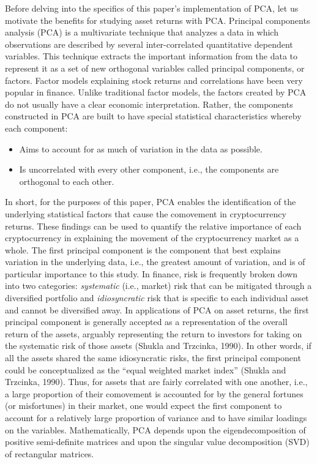 \documentclass[12pt,twoside]{article}
\begin{document}
Before delving into the specifics of this paper’s implementation of PCA, let us motivate the benefits for studying asset returns with PCA. Principal components analysis (PCA) is a multivariate technique that analyzes a data in which observations are described by several inter-correlated quantitative dependent variables. This technique extracts the important information from the data to represent it as a set of new orthogonal variables called principal components, or factors.
\bigbreak
Factor models explaining stock returns and correlations have been very popular in finance. Unlike traditional factor models, the factors created by PCA do not usually have a clear economic interpretation. Rather, the components constructed in PCA are built to have special statistical characteristics whereby each component: 
\begin{itemize}
	\item Aims to account for as much of variation in the data as possible.
	\item Is uncorrelated with every other component, i.e., the components are orthogonal to each other.
\end{itemize}

In short, for the purposes of this paper, PCA enables the identification of the underlying statistical factors that cause the comovement in cryptocurrency returns. These findings can be used to quantify the relative importance of each cryptocurrency in explaining the movement of the cryptocurrency market as a whole.
\bigbreak
The first principal component is the component that best explains variation in the underlying data, i.e., the greatest amount of variation, and is of particular importance to this study. In finance, risk is frequently broken down into two categories: \textit{systematic} (i.e., market) risk that can be mitigated through a diversified portfolio and \textit{idiosyncratic} risk that is specific to each individual asset and cannot be diversified away. In applications of PCA on asset returns, the first principal component is generally accepted as a representation of the overall return of the assets, arguably representing the return to investors for taking on the systematic risk of those assets (Shukla and Trzcinka, 1990). In other words, if all the assets shared the same idiosyncratic risks, the first principal component could be conceptualized as the “equal weighted market index” (Shukla and Trzcinka, 1990). Thus, for assets that are fairly correlated with one another, i.e., a large proportion of their comovement is accounted for by the general fortunes (or misfortunes) in their market, one would expect the first component to account for a relatively large proportion of variance and to have similar loadings on the variables.
\bigbreak
Mathematically, PCA depends upon the eigendecomposition of positive semi-definite matrices and upon the singular value decomposition (SVD) of rectangular matrices.
\end{document}

